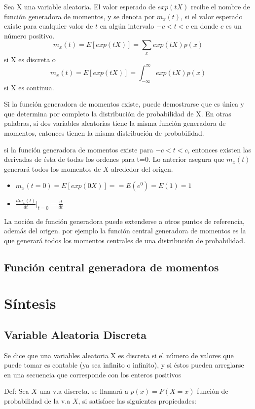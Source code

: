 \documentclass{book}
\begin{document}
Sea X una variable aleatoria. El valor esperado de $exp(tX)$ recibe el nombre de función generadora de momentos, y se denota por $m_x(t)$, si el valor esperado existe para cualquier valor de $t$ en algún intervalo $-c < t <c$ en donde $c$ es un número positivo. 
$$m_x(t)=E[exp(tX)]=\underset{x}{\sum}exp(tX)p(x)$$  si X es discreta o $$m_x(t)=E[exp(tX)]=\int_{-\infty}^\infty exp(tX)p(x)$$ si X es continua.

Si la función generadora de momentos existe, puede demostrarse que es única y que determina por completo la distribución de probabilidad de X. En otras palabras, si dos variables aleatorias tiene la misma función generadora de momentos, entonces tienen la misma distribución de probabilidad. 

si la función generadora de momentos existe para $-c < t < c$, entonces existen las derivadas de ésta de todas los ordenes para t=0. Lo anterior asegura que $m_x(t)$ generará todos los momentos de $X$ alrededor del origen. 

\begin{itemize}
    \item $m_x(t=0) = E[exp(0X)]= = E(e^0) = E(1)=1$
    \item $\frac{dm_x(t)}{dt}|_{t=0} = \frac{d}{dt}$
\end{itemize}

La noción de función generadora puede extenderse a otros puntos de referencia, además del origen. por ejemplo la función central generadora de momentos es la que generará todos los momentos centrales de una distribución de probabilidad.

\subsection{Función central generadora de momentos}

\section{Síntesis}
\subsection{Variable Aleatoria Discreta} Se dice que una variables aleatoria X es discreta si el número de valores que puede tomar es contable (ya sea infinito o infinito), y si éstos pueden arreglarse en una secuencia que corresponde con los enteros positivos

Def: Sea $X$ una v.a discreta. se llamará a $p(x)=P(X=x)$ función de probabilidad de la v.a $X$, si satisface las siguientes propiedades:
\end{document}
